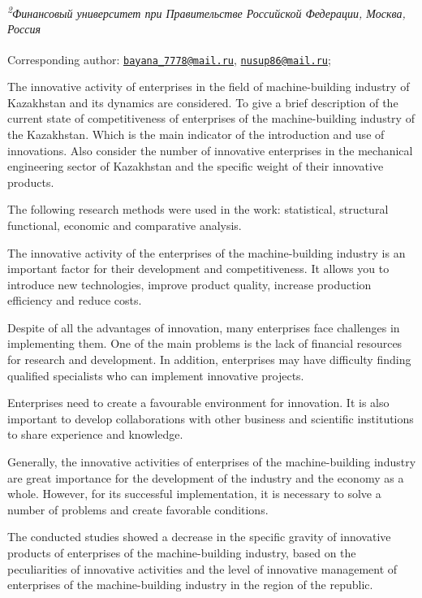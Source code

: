 {{\emph{\textsuperscript{2}Финансовый университет при Правительстве
Российской Федерации, Москва, Россия}

{\bfseries \textsuperscript{\envelope }}Corresponding author:
\href{mailto:bayana_7778@mail.ru}{\nolinkurl{bayana\_7778@mail.ru}},
\href{mailto:nusup86@mail.ru}{\nolinkurl{nusup86@mail.ru}};

The innovative activity of enterprises in the field of machine-building
industry of Kazakhstan and its dynamics are considered. To give a brief
description of the current state of competitiveness of enterprises of
the machine-building industry of the Kazakhstan. Which is the main
indicator of the introduction and use of innovations. Also consider the
number of innovative enterprises in the mechanical engineering sector of
Kazakhstan and the specific weight of their innovative products.

The following research methods were used in the work: statistical,
structural functional, economic and comparative analysis.

The innovative activity of the enterprises of the machine-building
industry is an important factor for their development and
competitiveness. It allows you to introduce new technologies, improve
product quality, increase production efficiency and reduce costs.

Despite of all the advantages of innovation, many enterprises face
challenges in implementing them. One of the main problems is the lack of
financial resources for research and development. In addition,
enterprises may have difficulty finding qualified specialists who can
implement innovative projects.

Enterprises need to create a favourable environment for innovation. It
is also important to develop collaborations with other business and
scientific institutions to share experience and knowledge.

Generally, the innovative activities of enterprises of the
machine-building industry are great importance for the development of
the industry and the economy as a whole. However, for its successful
implementation, it is necessary to solve a number of problems and create
favorable conditions.

The conducted studies showed a decrease in the specific gravity of
innovative products of enterprises of the machine-building industry,
based on the peculiarities of innovative activities and the level of
innovative management of enterprises of the machine-building industry in
the region of the republic.

}}
